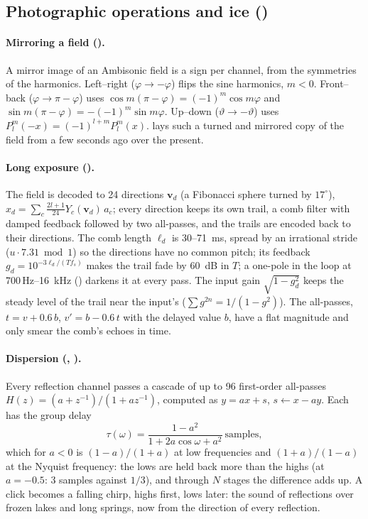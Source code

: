 \subsection{Photographic operations and ice ()}
\label{sec:math-spacefx}
\paragraph{Mirroring a field ().} A mirror image of an Ambisonic field is a sign per channel, from the
symmetries of the harmonics. Left--right ($\varphi\to-\varphi$) flips the sine harmonics, $m<0$. Front--back
($\varphi\to\pi-\varphi$) uses $\cos m(\pi-\varphi) = (-1)^m\cos m\varphi$ and $\sin m(\pi-\varphi) = -(-1)^m\sin m\varphi$.
Up--down ($\vartheta\to-\vartheta$) uses $P_l^m(-x) = (-1)^{l+m}P_l^m(x)$.  lays such a turned
and mirrored copy of the field from a few seconds ago over the present.

\paragraph{Long exposure ().} The field is decoded to 24 directions $\mathbf v_d$ (a Fibonacci sphere
turned by $17^\circ$), $x_d = \sum_c\tfrac{2l+1}{24}Y_c(\mathbf v_d)\,a_c$; every direction keeps its own trail, a comb
filter with damped feedback followed by two all-passes, and the trails are encoded back to their directions. The comb
length $\ell_d$ is 30--\SI{71}{ms}, spread by an irrational stride ($u\cdot7.31 \bmod 1$) so the directions have no common
pitch; its feedback $g_d = 10^{-3\ell_d/(Tf_s)}$ makes the trail fade by \SI{60}{dB} in $T$; a one-pole in the loop at
700\,Hz--\SI{16}{kHz} () darkens it at every pass. The input gain $\sqrt{1-g_d^2}$ keeps the steady level of
the trail near the input's ($\sum g^{2n} = 1/(1-g^2)$). The all-passes, $t = v + 0.6\,b$, $v' = b - 0.6\,t$ with the delayed
value $b$, have a flat magnitude and only smear the comb's echoes in time.

\paragraph{Dispersion (, ).} Every reflection channel passes a cascade of up to 96 first-order
all-passes $H(z) = (a + z^{-1})/(1 + az^{-1})$, computed as $y = ax + s$, $s \leftarrow x - ay$. Each has the group delay
\begin{equation}
  \tau(\omega) = \frac{1-a^2}{1 + 2a\cos\omega + a^2}\ \text{samples},
\end{equation}
which for $a<0$ is $(1-a)/(1+a)$ at low frequencies and $(1+a)/(1-a)$ at the Nyquist frequency: the lows are held back more
than the highs (at $a=-0.5$: 3 samples against $1/3$), and through $N$ stages the difference adds up. A click becomes a
falling chirp, highs first, lows later: the sound of reflections over frozen lakes and long springs, now from the direction
of every reflection.
